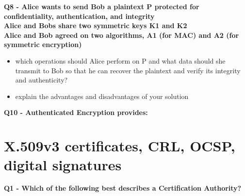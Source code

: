 \textbf{Q8 - Alice wants to send Bob a plaintext P protected for confidentiality, authentication, and integrity \\
Alice and Bobs share two symmetric keys K1 and K2 \\
Alice and Bob agreed on two algorithms, A1 (for MAC) and A2 (for symmetric encryption)}
\begin{itemize}
    \item which operations should Alice perform on P and what data
    should she transmit to Bob so that he can recover the plaintext
    and verify its integrity and authenticity?
    \item explain the advantages and disadvantages of your solution 
\end{itemize}


\textbf{Q10  - Authenticated Encryption provides:}




\section*{X.509v3 certificates, CRL, OCSP, digital signatures}

\textbf{Q1 - Which of the following best describes a Certification Authority?}

